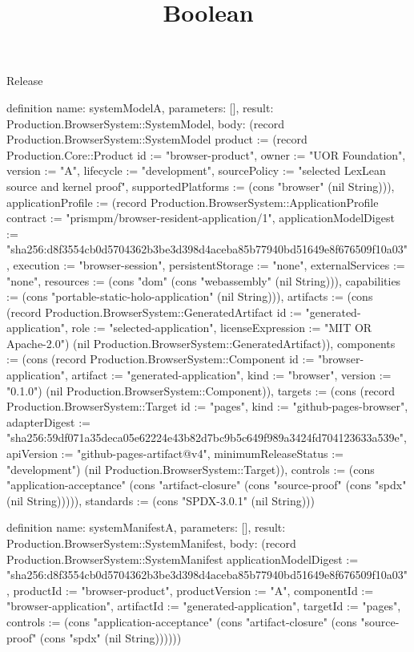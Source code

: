 \begin{lexlean}{Release}
\title{Boolean}
\begin{semanticmodule}
definition{
  name: systemModelA,
  parameters: [],
  result: Production.BrowserSystem::SystemModel,
  body: (record Production.BrowserSystem::SystemModel {product := (record Production.Core::Product {id := "browser-product", owner := "UOR Foundation", version := "A", lifecycle := "development", sourcePolicy := "selected LexLean source and kernel proof", supportedPlatforms := (cons "browser" (nil String))}), applicationProfile := (record Production.BrowserSystem::ApplicationProfile {contract := "prismpm/browser-resident-application/1", applicationModelDigest := "sha256:d8f3554cb0d5704362b3be3d398d4aceba85b77940bd51649e8f676509f10a03", execution := "browser-session", persistentStorage := "none", externalServices := "none", resources := (cons "dom" (cons "webassembly" (nil String))), capabilities := (cons "portable-static-holo-application" (nil String))}), artifacts := (cons (record Production.BrowserSystem::GeneratedArtifact {id := "generated-application", role := "selected-application", licenseExpression := "MIT OR Apache-2.0"}) (nil Production.BrowserSystem::GeneratedArtifact)), components := (cons (record Production.BrowserSystem::Component {id := "browser-application", artifact := "generated-application", kind := "browser", version := "0.1.0"}) (nil Production.BrowserSystem::Component)), targets := (cons (record Production.BrowserSystem::Target {id := "pages", kind := "github-pages-browser", adapterDigest := "sha256:59df071a35deca05e62224e43b82d7bc9b5c649f989a3424fd704123633a539e", apiVersion := "github-pages-artifact@v4", minimumReleaseStatus := "development"}) (nil Production.BrowserSystem::Target)), controls := (cons "application-acceptance" (cons "artifact-closure" (cons "source-proof" (cons "spdx" (nil String))))), standards := (cons "SPDX-3.0.1" (nil String))})
}

definition{
  name: systemManifestA,
  parameters: [],
  result: Production.BrowserSystem::SystemManifest,
  body: (record Production.BrowserSystem::SystemManifest {applicationModelDigest := "sha256:d8f3554cb0d5704362b3be3d398d4aceba85b77940bd51649e8f676509f10a03", productId := "browser-product", productVersion := "A", componentId := "browser-application", artifactId := "generated-application", targetId := "pages", controls := (cons "application-acceptance" (cons "artifact-closure" (cons "source-proof" (cons "spdx" (nil String)))))})
}


\end{semanticmodule}
\end{lexlean}
